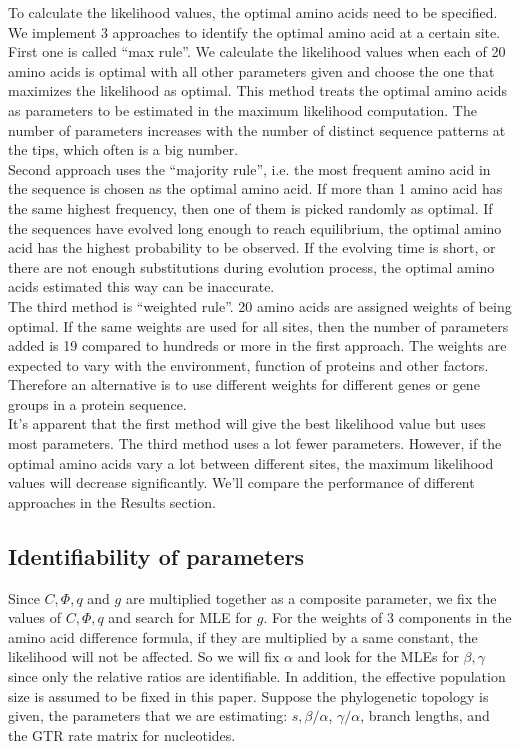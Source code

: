 \documentclass[13pt]{article}
\begin{document}
To calculate the likelihood values, the optimal amino acids need to be specified. We implement 3 approaches to identify the optimal amino acid at a certain site. First one is called ``max rule''. We calculate the likelihood values when each of 20 amino acids is optimal with all other parameters given and choose the one that maximizes the likelihood as optimal. This method treats the optimal amino acids as parameters to be estimated in the maximum likelihood computation. The number of parameters increases with the number of distinct sequence patterns at the tips, which often is a big number. \\
Second approach uses the ``majority rule'', i.e. the most frequent amino acid in the sequence is chosen as the optimal amino acid. If more than 1 amino acid has the same highest frequency, then one of them is picked randomly as optimal. If the sequences have evolved long enough to reach equilibrium, the optimal amino acid has the highest probability to be observed. If the evolving time is short, or there are not enough substitutions during evolution process, the optimal amino acids estimated this way can be inaccurate. \\
The third method is ``weighted rule''. 20 amino acids are assigned weights of being optimal. If the same weights are used for all sites, then the number of parameters added is 19 compared to hundreds or more in the first approach. The weights are expected to vary with the environment, function of proteins and other factors. Therefore an alternative is to use different weights for different genes or gene groups in a protein sequence. \\
It's apparent that the first method will give the best likelihood value but uses most parameters. The third method uses a lot fewer parameters. However, if the optimal amino acids vary a lot between different sites, the maximum likelihood values will decrease significantly. We'll compare the performance of different approaches in the Results section.\\

\subsection{Identifiability of parameters}
Since $C, \Phi, q$ and $g$ are multiplied together as a composite parameter, we fix the values of $C, \Phi, q$ and search for MLE for $g$. For the weights of 3 components in the amino acid difference formula, if they are multiplied by a same constant, the likelihood will not be affected. So we will fix $\alpha$ and look for the MLEs for $\beta, \gamma$ since only the relative ratios are identifiable. In addition, the effective population size is assumed to be fixed in this paper. Suppose the phylogenetic topology is given, the parameters that we are estimating: $s, \beta/\alpha$, $\gamma/\alpha$, branch lengths, and the GTR rate matrix for nucleotides. 
\end{document}
